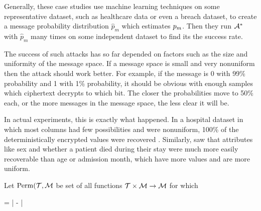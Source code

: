Generally, these case studies use machine learning techniques on some representative dataset, such as healthcare data or even a breach dataset, to create a message probability distribution $\hat p_m$ which estimates $p_m$. Then they run ${\mathcal A}^*$ with $\hat p_m$ many times on some independent dataset to find its the success rate.

The success of such attacks has so far depended on factors such as the size and uniformity of the message space. If a message space is small and very nonuniform then the attack should work better. For example, if the message is 0 with 99\% probability and 1 with 1\% probability, it should be obvious with enough samples which ciphertext decrypts to which bit. The closer the probabilities move to 50\% each, or the more messages in the message space, the less clear it will be.

In actual experiments, this is exactly what happened. In a hospital dataset in which most columns had few possibilities and were nonuniform, 100\% of the deterministically encrypted values were recovered \cite{Bindschaelder2018tao}. Similarly, \cite{Naveed2015inference} saw that attributes like sex and whether a patient died during their stay were much more easily recoverable than age or admission month, which have more values and are more uniform.

\bnm
\tweakCipher\Colon\keyspace\times\tweakspace\times\msgspace \rightarrow \msgspace
\enm

Let $\mathrm{Perm}(\mathcal{T},{\cal M}$ be set of all functions
$\mathcal{T}\times{\cal M}\rightarrow{\cal M}$ for which 


\bnm
\AdvTPRP{\tweakCipher}{\advA} = \left| -  \right|
\enm

